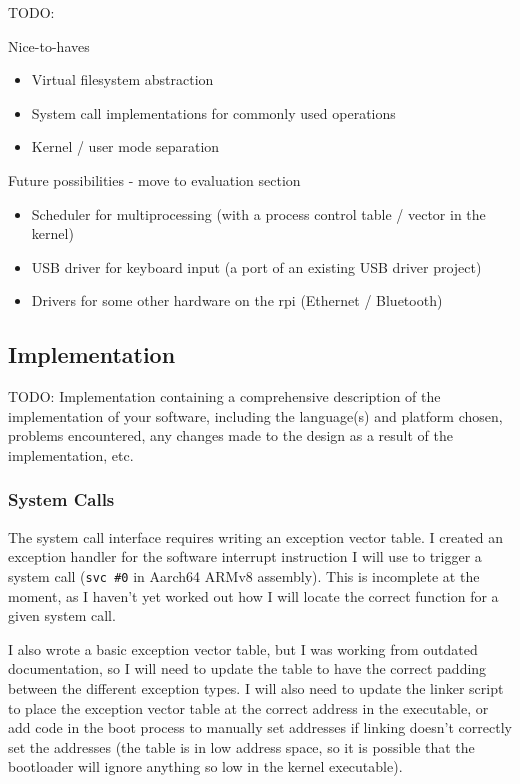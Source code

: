\documentclass{article}
\begin{document}
TODO:

Nice-to-haves
\begin{itemize}
    \item Virtual filesystem abstraction
    \item System call implementations for commonly used operations
    \item Kernel / user mode separation
\end{itemize}

Future possibilities - move to evaluation section
\begin{itemize}
    \item Scheduler for multiprocessing (with a process control table / vector
        in the kernel)
    \item USB driver for keyboard input (a port of an existing USB driver
        project)
    \item Drivers for some other hardware on the \gls{rpi} (Ethernet /
        Bluetooth)
\end{itemize}


\subsection{Implementation}
TODO: Implementation containing a comprehensive description of the
implementation of your software, including the language(s) and platform chosen,
problems encountered, any changes made to the design as a result of the
implementation, etc.

\subsubsection{System Calls}
\label{sec:impl_syscalls}
The system call interface requires writing an exception vector table. I created
an exception handler for the software interrupt instruction I will use to
trigger a system call (\texttt{svc \#0} in Aarch64 ARMv8 assembly). This is
incomplete at the moment, as I haven't yet worked out how I will locate the
correct function for a given system call.

I also wrote a basic exception vector table, but I was working from outdated
documentation, so I will need to update the table to have the correct padding
between the different exception types. I will also need to update the linker
script to place the exception vector table at the correct address in the
executable, or add code in the boot process to manually set addresses if
linking doesn't correctly set the addresses (the table is in low address space,
so it is possible that the bootloader will ignore anything so low in the kernel
executable).
\end{document}
